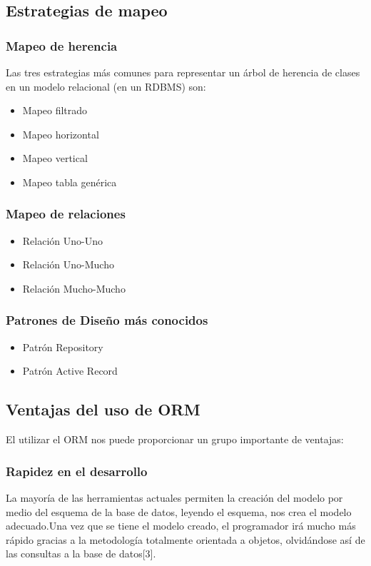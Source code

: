 \documentclass[twoside,twocolumn]{article}
\begin{document}
\subsection{Estrategias de mapeo}

\subsubsection{Mapeo de herencia}
Las tres estrategias más comunes para representar un árbol de herencia de clases en un modelo relacional (en un RDBMS) son:
\begin{itemize}	
\item Mapeo filtrado
\item Mapeo horizontal
\item Mapeo vertical
\item Mapeo tabla genérica
\end{itemize} 
\subsubsection{Mapeo de relaciones}
\begin{itemize}	
\item Relación Uno-Uno
\item Relación Uno-Mucho
\item Relación Mucho-Mucho
\end{itemize} 
\subsubsection{Patrones de Diseño más conocidos}
\begin{itemize}	
\item Patrón Repository
\item Patrón Active Record
\end{itemize} 
\subsection{Ventajas del uso de ORM}
El utilizar el ORM nos puede proporcionar un grupo importante de ventajas:
\subsubsection{Rapidez en el desarrollo}
La mayoría de las herramientas actuales permiten la creación del modelo por medio del esquema de la base de datos, leyendo el esquema, nos crea el modelo adecuado.Una vez que se tiene el modelo creado, el programador irá mucho más rápido gracias a la metodología totalmente orientada a objetos, olvidándose así de las consultas a la base de datos[3].
\end{document}
